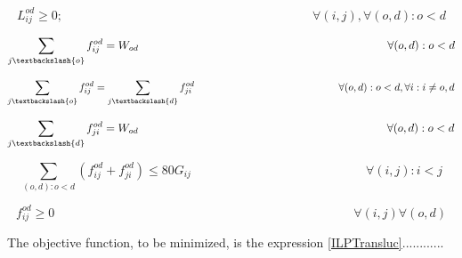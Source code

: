 \begin{equation}
L_{ij}^{od} \geq 0;
\qquad \qquad \qquad \qquad \qquad \qquad \qquad \qquad \qquad \qquad
\forall (i,j) , \forall (o,d) : o < d
\label{ILPTransluc5}
\end{equation}

\begin{equation}
\sum_{j \textbackslash \{o\} } f_{ij}^{od} = W_{od}
\qquad \qquad \qquad \qquad \qquad \qquad \qquad \qquad \qquad \qquad \qquad
\forall (o,d):o<d
\label{ILPTransluc6}
\end{equation}

\begin{equation}
\sum_{j \textbackslash \{o\} } f_{ij}^{od} = \sum_{j \textbackslash \{d\} } f_{ji}^{od}
\qquad \qquad \qquad \qquad \qquad \qquad \qquad
\forall (o,d):o<d , \forall i : i \neq o,d
\label{ILPTransluc7}
\end{equation}

\begin{equation}
\sum_{j \textbackslash \{d\} } f_{ji}^{od} = W_{od}
\qquad \qquad \qquad \qquad \qquad \qquad \qquad \qquad \qquad \qquad \qquad
\forall (o,d):o<d
\label{ILPTransluc8}
\end{equation}

\begin{equation}
\sum_{(o,d):o<d} \left( f_{ij}^{od} + f_{ji}^{od}\right) \leq 80 G_{ij}
\qquad \qquad \qquad \qquad \qquad \qquad \qquad
\forall (i,j) : i < j
\label{ILPTransluc9}
\end{equation}

\begin{equation}
f_{ij}^{od} \geq 0
\qquad \qquad \qquad \qquad \qquad \qquad \qquad \qquad \qquad \qquad \qquad \qquad
\forall (i,j) \forall (o,d)
\label{ILPTransluc10}
\end{equation}	

\vspace{10pt}

The objective function, to be minimized, is the expression \ref{ILPTransluc}............
